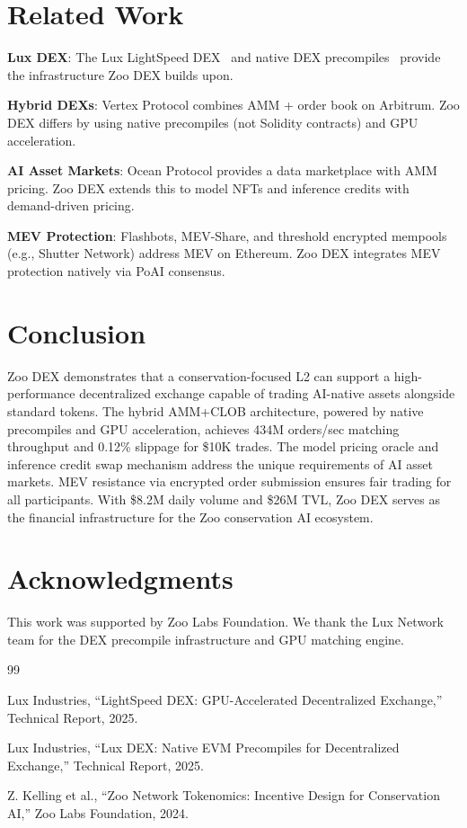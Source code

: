 \documentclass[11pt,letterpaper]{article}
\begin{document}
\section{Related Work}

\textbf{Lux DEX}: The Lux LightSpeed DEX~\cite{lux-lightspeed-dex} and native DEX precompiles~\cite{lux-dex} provide the infrastructure Zoo DEX builds upon.

\textbf{Hybrid DEXs}: Vertex Protocol combines AMM + order book on Arbitrum. Zoo DEX differs by using native precompiles (not Solidity contracts) and GPU acceleration.

\textbf{AI Asset Markets}: Ocean Protocol provides a data marketplace with AMM pricing. Zoo DEX extends this to model NFTs and inference credits with demand-driven pricing.

\textbf{MEV Protection}: Flashbots, MEV-Share, and threshold encrypted mempools (e.g., Shutter Network) address MEV on Ethereum. Zoo DEX integrates MEV protection natively via PoAI consensus.

\section{Conclusion}

Zoo DEX demonstrates that a conservation-focused L2 can support a high-performance decentralized exchange capable of trading AI-native assets alongside standard tokens. The hybrid AMM+CLOB architecture, powered by native precompiles and GPU acceleration, achieves 434M orders/sec matching throughput and 0.12\% slippage for \$10K trades. The model pricing oracle and inference credit swap mechanism address the unique requirements of AI asset markets. MEV resistance via encrypted order submission ensures fair trading for all participants. With \$8.2M daily volume and \$26M TVL, Zoo DEX serves as the financial infrastructure for the Zoo conservation AI ecosystem.

\section*{Acknowledgments}

This work was supported by Zoo Labs Foundation. We thank the Lux Network team for the DEX precompile infrastructure and GPU matching engine.


\begin{thebibliography}{99}

Lux Industries, ``LightSpeed DEX: GPU-Accelerated Decentralized Exchange,'' Technical Report, 2025.

Lux Industries, ``Lux DEX: Native EVM Precompiles for Decentralized Exchange,'' Technical Report, 2025.

Z. Kelling et al., ``Zoo Network Tokenomics: Incentive Design for Conservation AI,'' Zoo Labs Foundation, 2024.

\end{thebibliography}
\end{document}
